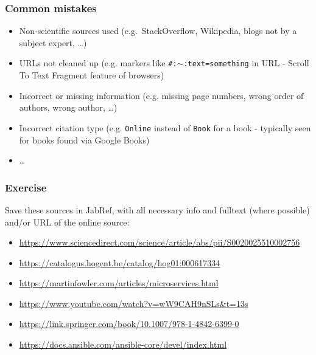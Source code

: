 \documentclass[aspectratio=169]{beamer}
\begin{document}
\begin{frame}
  \frametitle{Common mistakes}

  \begin{itemize}
    \item Non-scientific sources used (e.g.\ StackOverflow, Wikipedia, blogs not by a subject expert, \ldots)
    \item URLs not cleaned up (e.g. markers like \texttt{\#:$\sim$:text=something} in URL - Scroll To Text Fragment feature of browsers)
    \item Incorrect or missing information (e.g. missing page numbers, wrong order of authors, wrong author, \ldots)
    \item Incorrect citation type (e.g. \texttt{Online} instead of \texttt{Book} for a book - typically seen for books found via Google Books)
    \item \ldots
  \end{itemize}
\end{frame}

\begin{frame}[plain]
    \frametitle{Exercise}
    
    Save these sources in JabRef, with all necessary info and fulltext (where possible) and/or URL of the online source:
    
    \bigskip
    
    \begin{itemize}
        \item \url{https://www.sciencedirect.com/science/article/abs/pii/S0020025510002756}
        \item \url{https://catalogus.hogent.be/catalog/hog01:000617334}
        \item \url{https://martinfowler.com/articles/microservices.html}
        \item \url{https://www.youtube.com/watch?v=wW9CAH9nSLs&t=13s}
        \item \url{https://link.springer.com/book/10.1007/978-1-4842-6399-0}
        \item \url{https://docs.ansible.com/ansible-core/devel/index.html}
    \end{itemize}
    
\end{frame}
\end{document}
